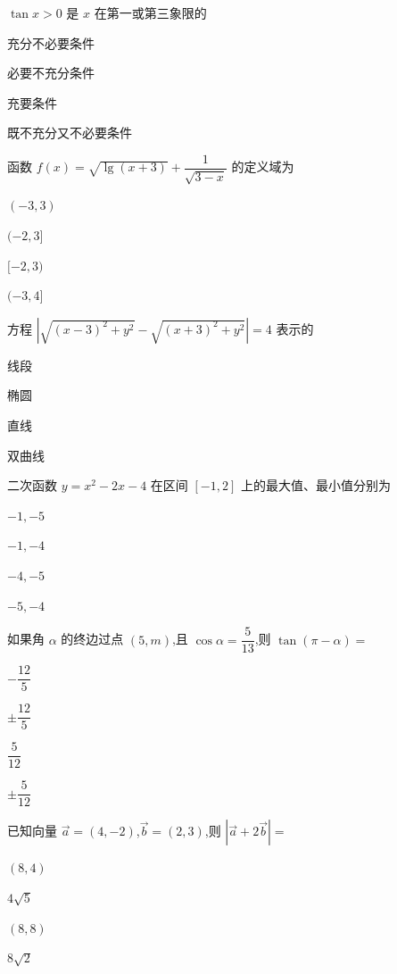 \documentclass{exam-zh}
\begin{document}
\begin{question}
    $\tan x > 0$ 是 $x$ 在第一或第三象限的 \paren[C]
    \begin{choices}
        \item 充分不必要条件
        \item 必要不充分条件
        \item 充要条件
        \item 既不充分又不必要条件
    \end{choices}
\end{question}

\begin{question}
    函数 $f(x)=\sqrt{\lg(x + 3)}+\dfrac{1}{\sqrt{3 - x}}$ 的定义域为\paren[C]
    \begin{choices}
        \item $(-3,3)$
        \item $(-2,3]$
        \item $[-2,3)$
        \item $(-3,4]$
    \end{choices}
\end{question}

\begin{question}
    方程 $|\sqrt{(x - 3)^2 + y^2}-\sqrt{(x + 3)^2 + y^2}|=4$ 表示的\paren[D]
    \begin{choices}
        \item 线段
        \item 椭圆
        \item 直线
        \item 双曲线
    \end{choices}
\end{question}




\begin{question}
    二次函数 $y = x^2 - 2x - 4$ 在区间 $[-1,2]$ 上的最大值、最小值分别为\paren[A]
    \begin{choices}
        \item $-1, -5$
        \item $-1, -4$
        \item $-4, -5$
        \item $-5, -4$
    \end{choices}
    \end{question}
    
    \begin{question}
    如果角 $\alpha$ 的终边过点 $(5,m)$,且 $\cos\alpha=\dfrac{5}{13}$,则 $\tan(\pi - \alpha)=$\paren[A]
    \begin{choices}
        \item $-\dfrac{12}{5}$
        \item $\pm\dfrac{12}{5}$
        \item $\dfrac{5}{12}$
        \item $\pm\dfrac{5}{12}$
    \end{choices}
    \end{question}
    
    \begin{question}
    已知向量 $\vec{a}=(4,-2)$,$\vec{b}=(2,3)$,则 $|\vec{a} + 2\vec{b}|=$\paren[B]
    \begin{choices}
        \item $(8,4)$
        \item $4\sqrt{5}$
        \item $(8,8)$
        \item $8\sqrt{2}$
    \end{choices}
    \end{question}
\end{document}
